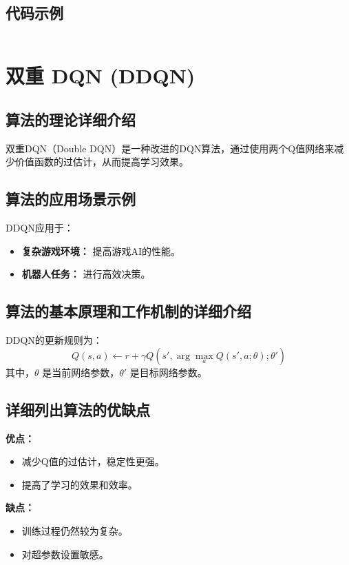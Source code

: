 \subsection*{代码示例}
\begin{lstlisting}

\end{lstlisting}


\section{双重 DQN (DDQN)}
\subsection*{算法的理论详细介绍}
双重DQN（Double DQN）是一种改进的DQN算法，通过使用两个Q值网络来减少价值函数的过估计，从而提高学习效果。

\subsection*{算法的应用场景示例}
DDQN应用于：
\begin{itemize}
    \item \textbf{复杂游戏环境：} 提高游戏AI的性能。
    \item \textbf{机器人任务：} 进行高效决策。
\end{itemize}

\subsection*{算法的基本原理和工作机制的详细介绍}
DDQN的更新规则为：
\[
    Q(s, a) \leftarrow r + \gamma Q(s', \arg\max_a Q(s', a; \theta); \theta')
\]
其中，\(\theta\) 是当前网络参数，\(\theta'\) 是目标网络参数。

\subsection*{详细列出算法的优缺点}
\textbf{优点：}
\begin{itemize}
    \item 减少Q值的过估计，稳定性更强。
    \item 提高了学习的效果和效率。
\end{itemize}

\textbf{缺点：}
\begin{itemize}
    \item 训练过程仍然较为复杂。
    \item 对超参数设置敏感。
\end{itemize}

